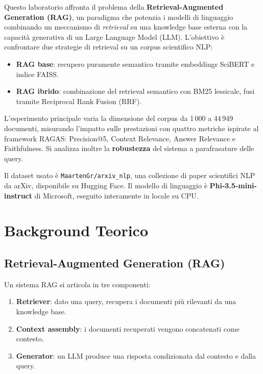 \documentclass[12pt,a4paper]{article}
\begin{document}
Questo laboratorio affronta il problema della \textbf{Retrieval-Augmented Generation (RAG)}, un paradigma che potenzia i modelli di linguaggio combinando un meccanismo di \textit{retrieval} su una knowledge base esterna con la capacit\`a generativa di un Large Language Model (LLM). L'obiettivo \`e confrontare due strategie di retrieval su un corpus scientifico NLP:

\begin{itemize}
  \item \textbf{RAG base}: recupero puramente semantico tramite embeddings SciBERT e indice FAISS.
  \item \textbf{RAG ibrido}: combinazione del retrieval semantico con BM25 lessicale, fusi tramite Reciprocal Rank Fusion (RRF).
\end{itemize}

L'esperimento principale varia la dimensione del corpus da 1\,000 a 44\,949 documenti, misurando l'impatto sulle prestazioni con quattro metriche ispirate al framework RAGAS: Precision@5, Context Relevance, Answer Relevance e Faithfulness. Si analizza inoltre la \textbf{robustezza} del sistema a parafrasature delle query.

Il dataset usato \`e \texttt{MaartenGr/arxiv\_nlp}, una collezione di paper scientifici NLP da arXiv, disponibile su Hugging Face. Il modello di linguaggio \`e \textbf{Phi-3.5-mini-instruct} di Microsoft, eseguito interamente in locale su CPU.

\section{Background Teorico}

\subsection{Retrieval-Augmented Generation (RAG)}

Un sistema RAG si articola in tre componenti:
\begin{enumerate}
  \item \textbf{Retriever}: dato una query, recupera i documenti pi\`u rilevanti da una knowledge base.
  \item \textbf{Context assembly}: i documenti recuperati vengono concatenati come contesto.
  \item \textbf{Generator}: un LLM produce una risposta condizionata dal contesto e dalla query.
\end{enumerate}
\end{document}
